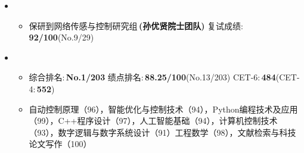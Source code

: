   \begin{itemize}[leftmargin=*]
    
    \item
      {\small
      \begin{itemize}
          \item 保研到网络传感与控制研究组$\,$\textbf{(孙优贤院士团队)}\quad\quad\quad 
{ \quad 复试成绩:$\,${\textbf{92/100}(No.9/29)} }
      \end{itemize}
      
      }
    
    \item
      {\small
      	
      \begin{itemize}
      	 \item 综合排名:$\,${\textbf{No.1/203}} \quad\quad\quad\quad \quad  绩点排名:$\,${\textbf{88.25/100}(No.13/203)}  \quad\quad    \quad\quad\quad CET-6:$\,$\textbf{484}(CET-4:$\,$\textbf{552})
      	 \\
        \item{自动控制原理（96），智能优化与控制技术（94），Python编程技术及应用（99），C++程序设计（97），人工智能基础（94），计算机控制技术（93），数字逻辑与数字系统设计（91）工程数学（98），文献检索与科技论文写作（100）
        }
      \end{itemize}
      }
      
      
  
  \end{itemize}